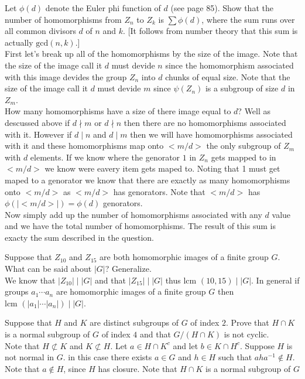 \documentclass[12pt]{article}
\makeatletter
\theoremstyle{homework}
\newenvironment{exercise}[1]
{\def\@currentlabel{#1}\exercisecore}
{\endexercisecore}
\makeatother
\begin{document}
\begin{exercise}{10.43}
Let $\phi(d)$ denote the Euler phi function of $d$ (see page 85). Show that the number of homomorphisms from $Z_n$ to $Z_k$ is $\sum\phi(d)$, where the sum runs over all common divisors $d$ of $n$ and $k$. [It follows from number theory that this sum is actually $\text{gcd}(n, k)$.]\\
First let's break up all of the homomorphisms by the size of the image.  Note that the size of the image call it $d$ must devide $n$ since the homomorphism associated with this image devides the group $Z_n$ into $d$ chunks of equal size.  Note that the size of the image call it $d$ must devide $m$ since $\psi(Z_n)$ is a subgroup of size $d$ in $Z_m$.\\
How many homomorphisms have a size of there image equal to $d$?  Well as descussed above if $d\nmid m$ or $d\nmid n$ then there are no homomorphisms associated with it.  However if $d\mid n$ and $d\mid m$ then we will have homomorphisms associated with it and these homomorphisms map onto $<m/d>$ the only subgroup of $Z_m$ with $d$ elements.  If we know where the genorator $1$ in $Z_n$ gets mapped to in $<m/d>$ we know were eavery item gets maped to.  Noting that 1 must get maped to a genorator we know that there are exactly as many homomorphisms onto $<m/d>$ as $<m/d>$ has genorators.  Note that $<m/d>$ has $\phi(|<m/d>|)=\phi(d)$ genorators.\\
Now simply add up the number of homomorphisms associated with any $d$ value and we have the total number of homomorphisms.  The result of this sum is exacty the sum described in the question.
\end{exercise}

\begin{exercise}{10.48}
Suppose that $Z_{10}$ and $Z_{15}$ are both homomorphic images of a finite group $G$. What can be said about $|G|$? Generalize.\\
We know that $|Z_{10}|\mid |G|$ and that $|Z_{15}|\mid |G|$ thus $\text{lcm } (10,15)\mid |G|$.  In general if groups $a_1\cdots a_n$ are homomorphic images of a finite group $G$ then $\text{lcm } (|a_1|\cdots |a_n|)\mid |G|$.
\end{exercise}

\begin{exercise}{10.59}
Suppose that $H$ and $K$ are distinct subgroups of $G$ of index $2$. Prove that $H \cap K$ is a normal subgroup of $G$ of index $4$ and that $G/(H \cap K)$ is not cyclic.\\
Note that $H\not\subset K$ and $K\not\subset H$.  Let $a\in H\cap K^c$ and let $b\in K\cap H^c$.  Suppose $H$ is not normal in $G$.  in this case there exists $a\in G$ and $h\in H$ such that $aha^{-1}\not\in H$.  Note that $a\not\in H$, since $H$ has closure.  Note that $H \cap K$ is a normal subgroup of $G$
\end{exercise}
\end{document}
